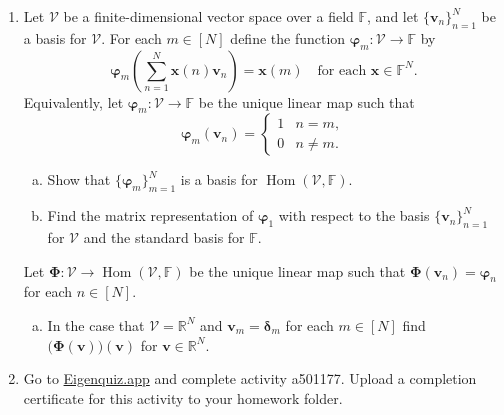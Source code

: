 \documentclass[12pt]{amsart}
\newcommand{\1}{\mathbbm{1}}
\numberwithin{equation}{section}
\numberwithin{Theorem}{section}
\theoremstyle{plain} %
\theoremstyle{definition}
\theoremstyle{remark}
\begin{document}
\begin{enumerate}[1.]
\item Let \(\mathcal{V}\) be a finite-dimensional vector space over a field \(\mathbb{F}\), and let \(\{\mathbf{v}_{n}\}_{n=1}^{N}\) be a basis for \(\mathcal{V}\). For each \(m\in[N]\) define the function \(\boldsymbol{\varphi}_{m}:\mathcal{V}\to\mathbb{F}\) by
\[\boldsymbol{\varphi}_{m}\left(\sum_{n=1}^{N}\mathbf{x}(n)\mathbf{v}_{n}\right) = \mathbf{x}(m)\quad\text{for each }\mathbf{x}\in\mathbb{F}^{N}.\]
Equivalently, let \(\boldsymbol{\varphi}_{m}:\mathcal{V}\to\mathbb{F}\) be the unique linear map such that
\[\boldsymbol{\varphi}_{m}(\mathbf{v}_{n}) = \begin{cases} 1 & n=m,\\ 0 & n\neq m.\end{cases}\]

\begin{enumerate}[(a)]

\item Show that \(\{\boldsymbol{\varphi}_{m}\}_{m=1}^{N}\) is a basis for \(\operatorname{Hom}(\mathcal{V},\mathbb{F})\).\medskip

\item Find the matrix representation of \(\boldsymbol{\varphi}_{1}\) with respect to the basis \(\{\mathbf{v}_{n}\}_{n=1}^{N}\) for \(\mathcal{V}\) and the standard basis for \(\mathbb{F}\).\medskip

\end{enumerate}

\noindent Let \(\mathbf{\Phi}:\mathcal{V}\to\operatorname{Hom}(\mathcal{V},\mathbb{F})\) be the unique linear map such that \(\mathbf{\Phi}(\mathbf{v}_{n}) = \boldsymbol{\varphi}_{n}\) for each \(n\in[N]\).\medskip

\begin{enumerate}[(a)]

\addtocounter{enumii}{2}

\item In the case that \(\mathcal{V}=\mathbb{R}^{N}\) and \(\mathbf{v}_{m}=\boldsymbol{\delta}_{m}\) for each \(m\in[N]\) find \(\big(\mathbf{\Phi}(\mathbf{v})\big)(\mathbf{v})\) for \(\mathbf{v}\in\mathbb{R}^{N}\). \medskip

\bigskip

\end{enumerate}

\item Go to \href{https://eigenquiz.app/}{Eigenquiz.app} and complete activity a501177. Upload a completion certificate for this activity to your homework folder.

\end{enumerate}
\end{document}
